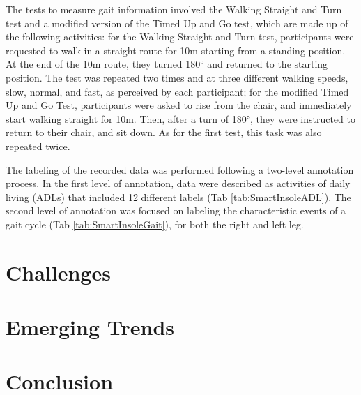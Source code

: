 The tests to measure gait information involved the Walking Straight and Turn test and a modified version of the Timed Up and Go test, which are made up of the following activities: for the Walking Straight and Turn test, participants were requested to walk in a straight route for 10m starting from a standing position. At the end of the 10m route, they turned 180° and returned to the starting position. The test was repeated two times and at three different walking speeds, slow, normal, and fast, as perceived by each participant; for the modified Timed Up and Go Test, participants were asked to rise from the chair, and immediately start walking straight for 10m. Then, after a turn of 180°, they were instructed to return to their chair, and sit down. As for the first test, this task was also repeated twice.

The labeling of the recorded data was performed following a two-level annotation process. In the first level of annotation, data were described as activities of daily living (ADLs) that included 12 different labels (Tab \ref{tab:SmartInsoleADL}). The second level of annotation was focused on labeling the characteristic events of a gait cycle (Tab \ref{tab:SmartInsoleGait}), for both the right and left leg. 



\section{Challenges}
\section{Emerging Trends}
\section{Conclusion}
